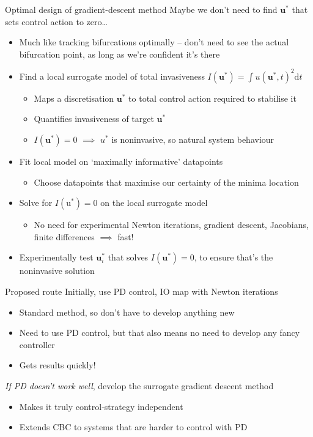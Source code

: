 \documentclass[presentation]{beamer}
\begin{document}
\begin{frame}[<+->][label={sec:orgaa6765f}]{Optimal design of gradient-descent method}
Maybe we don't need to find \(\mathbf{u}^*\) that sets control action to zero\ldots{}
\begin{itemize}
\item Much like tracking bifurcations optimally -- don't need to see the actual bifurcation point, as long as we're confident it's there
\item Find a local surrogate model of total invasiveness \(I(\mathbf{u}^*) = \int u(\mathbf{u}^*,t)^2 \mathrm{d}t\) 
\begin{itemize}
\item Maps a discretisation \(\mathbf{u}^*\) to total control action required to stabilise it
\item Quantifies invasiveness of target \(\mathbf{u}^*\)
\item \(I(\mathbf{u}^*)=0\) \(\implies\) \(u^*\) is noninvasive, so natural system behaviour
\end{itemize}
\item Fit local model on `maximally informative' datapoints
\begin{itemize}
\item Choose datapoints that maximise our certainty of the minima location
\end{itemize}
\item Solve for \(I(\mathrm{u}^*)=0\) on the local surrogate model
\begin{itemize}
\item No need for experimental Newton iterations, gradient descent, Jacobians, finite differences \(\implies\) fast!
\end{itemize}
\item Experimentally test \(\mathbf{u}^*_i\) that solves \(I(\mathbf{u}^*)=0\), to ensure that's the noninvasive solution
\end{itemize}
\end{frame}

\begin{frame}[label={sec:orgd1ac9cb}]{Proposed route}
Initially, use PD control, IO map with Newton iterations
\begin{itemize}
\item Standard method, so don't have to develop anything new
\item Need to use PD control, but that also means no need to develop any fancy controller
\item Gets results quickly!
\end{itemize}
\vfill
\emph{If PD doesn't work well}, develop the surrogate gradient descent method
\begin{itemize}
\item Makes it truly control-strategy independent
\item Extends CBC to systems that are harder to control with PD
\end{itemize}
\end{frame}
\end{document}
